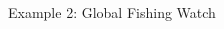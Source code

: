 \documentclass[xcolor=x11names,compress]{beamer}
\renewcommand{\(}{\begin{columns}}
\renewcommand{\)}{\end{columns}}
\newcommand{\<}[1]{\begin{column}{#1}}
\renewcommand{\>}{\end{column}}
\begin{document}
\begin{frame}{Example 2: Global Fishing Watch }
\begin{columns}[T]
\begin{column}{0.4\textwidth}
\begin{center}
\begin{itemize}

\end{itemize}
\end{center}
\end{column}
\end{columns}
\end{frame}
\end{document}
